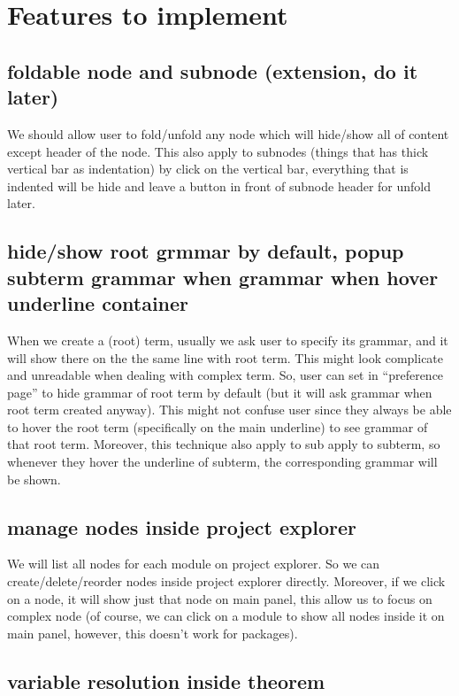 \section{Features to implement}

\subsection{foldable node and subnode (extension, do it later)}

We should allow user to fold/unfold any node which will hide/show all of content except header of the node. This also apply to subnodes (things that has thick vertical bar as indentation) by click on the vertical bar, everything that is indented will be hide and leave a button in front of subnode header for unfold later.

\subsection{hide/show root grmmar by default, popup subterm grammar when  grammar when hover underline container}

When we create a (root) term, usually we ask user to specify its grammar, and it will show there on the the same line with root term. This might look complicate and unreadable when dealing with complex term. So, user can set in ``preference page'' to hide grammar of root term by default (but it will ask grammar when root term created anyway). This might not confuse user since they always be able to hover the root term (specifically on the main underline) to see grammar of that root term. Moreover, this technique also apply to sub  apply to subterm, so whenever they hover the underline of subterm, the corresponding grammar will be shown.

\subsection{manage nodes inside project explorer}

We will list all nodes for each module on project explorer. So we can create/delete/reorder nodes inside project explorer directly. Moreover, if we click on a node, it will show just that node on main panel, this allow us to focus on complex node (of course, we can click on a module to show all nodes inside it on main panel, however, this doesn't work for packages).

\subsection{variable resolution inside theorem}

